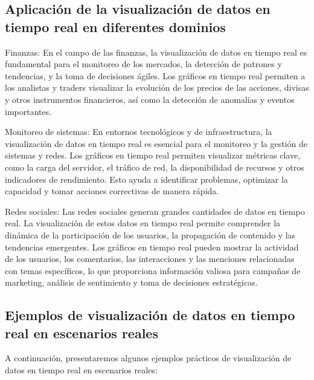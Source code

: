 \documentclass[
  a4paper,
]{article}
\begin{document}
\hypertarget{aplicaciuxf3n-de-la-visualizaciuxf3n-de-datos-en-tiempo-real-en-diferentes-dominios}{%
\subsection{Aplicación de la visualización de datos en tiempo real en
diferentes
dominios}\label{aplicaciuxf3n-de-la-visualizaciuxf3n-de-datos-en-tiempo-real-en-diferentes-dominios}}

Finanzas: En el campo de las finanzas, la visualización de datos en
tiempo real es fundamental para el monitoreo de los mercados, la
detección de patrones y tendencias, y la toma de decisiones ágiles. Los
gráficos en tiempo real permiten a los analistas y traders visualizar la
evolución de los precios de las acciones, divisas y otros instrumentos
financieros, así como la detección de anomalías y eventos importantes.

Monitoreo de sistemas: En entornos tecnológicos y de infraestructura, la
visualización de datos en tiempo real es esencial para el monitoreo y la
gestión de sistemas y redes. Los gráficos en tiempo real permiten
visualizar métricas clave, como la carga del servidor, el tráfico de
red, la disponibilidad de recursos y otros indicadores de rendimiento.
Esto ayuda a identificar problemas, optimizar la capacidad y tomar
acciones correctivas de manera rápida.

Redes sociales: Las redes sociales generan grandes cantidades de datos
en tiempo real. La visualización de estos datos en tiempo real permite
comprender la dinámica de la participación de los usuarios, la
propagación de contenido y las tendencias emergentes. Los gráficos en
tiempo real pueden mostrar la actividad de los usuarios, los
comentarios, las interacciones y las menciones relacionadas con temas
específicos, lo que proporciona información valiosa para campañas de
marketing, análisis de sentimiento y toma de decisiones estratégicas.

\hypertarget{ejemplos-de-visualizaciuxf3n-de-datos-en-tiempo-real-en-escenarios-reales}{%
\subsection{Ejemplos de visualización de datos en tiempo real en
escenarios
reales}\label{ejemplos-de-visualizaciuxf3n-de-datos-en-tiempo-real-en-escenarios-reales}}

A continuación, presentaremos algunos ejemplos prácticos de
visualización de datos en tiempo real en escenarios reales:
\end{document}
